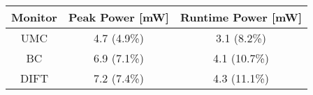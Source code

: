 

\begin{tabular}{|c|c|c|}
\hline

{\bf Monitor} & {\bf Peak Power [mW]} & {\bf Runtime Power [mW]} \\ \hline\hline

UMC  & 4.7 (4.9\%) &  3.1 (8.2\%) \\ \hline
BC   & 6.9 (7.1\%) &  4.1 (10.7\%) \\ \hline
DIFT & 7.2 (7.4\%) &  4.3 (11.1\%) \\ \hline

\end{tabular}
